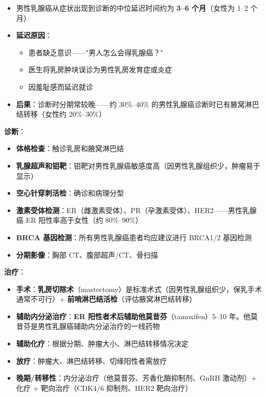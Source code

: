 \begin{itemize}[leftmargin=2cm]
	\item 男性乳腺癌从症状出现到诊断的中位延迟时间约为 \textbf{3--6 个月}（女性为 1--2 个月）
	\item \textbf{延迟原因}：
	\begin{itemize}
		\item 患者缺乏意识——"男人怎么会得乳腺癌？"
		\item 医生将乳房肿块误诊为男性乳房发育症或炎症
		\item 因羞耻感而延迟就诊
	\end{itemize}
	\item \textbf{后果}：诊断时分期常较晚——约 30\%--40\% 的男性乳腺癌诊断时已有腋窝淋巴结转移（女性约 20\%--30\%）
\end{itemize}

\vspace{0.5em}
\noindent\textbf{诊断}：

\begin{itemize}[leftmargin=2cm]
	\item \textbf{体格检查}：触诊乳房和腋窝淋巴结
	\item \textbf{乳腺超声和钼靶}：钼靶对男性乳腺癌敏感度高（因男性乳腺组织少，肿瘤易于显示）
	\item \textbf{空心针穿刺活检}：确诊和病理分型
	\item \textbf{激素受体检测}：ER（雌激素受体）、PR（孕激素受体）、HER2——男性乳腺癌 ER 阳性率高于女性（约 80\%--90\%）
	\item \textbf{BRCA 基因检测}：所有男性乳腺癌患者均应建议进行 BRCA1/2 基因检测
	\item \textbf{分期影像}：胸部 CT、腹部超声/CT、骨扫描
\end{itemize}

\vspace{0.5em}
\noindent\textbf{治疗}：

\begin{itemize}[leftmargin=2cm]
	\item \textbf{手术}：\textbf{乳房切除术}（mastectomy）是标准术式（因男性乳腺组织少，保乳手术通常不可行）+ \textbf{前哨淋巴结活检}（评估腋窝淋巴结转移）
	\item \textbf{辅助内分泌治疗}：\textbf{ER 阳性者术后辅助他莫昔芬}（tamoxifen）5--10 年。他莫昔芬是男性乳腺癌辅助内分泌治疗的一线药物
	\item \textbf{辅助化疗}：根据分期、肿瘤大小、淋巴结转移情况决定
	\item \textbf{放疗}：肿瘤大、淋巴结转移、切缘阳性者需放疗
	\item \textbf{晚期/转移性}：内分泌治疗（他莫昔芬、芳香化酶抑制剂、GnRH 激动剂）+ 化疗 + 靶向治疗（CDK4/6 抑制剂、HER2 靶向治疗）
\end{itemize}

